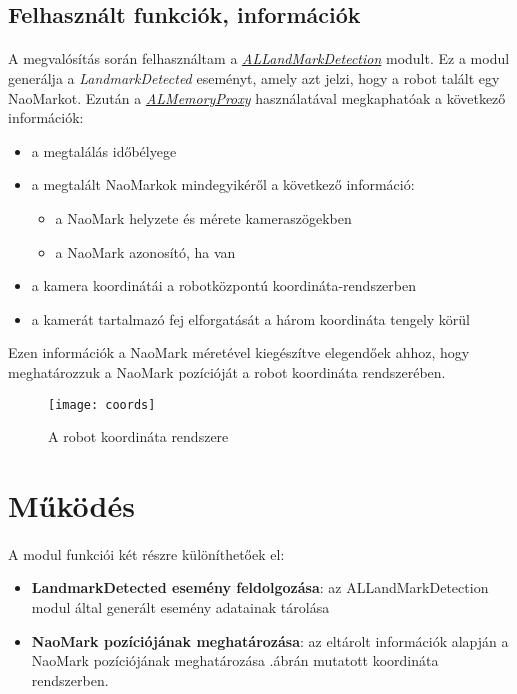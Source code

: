 \documentclass{article}
\numberwithin{figure}{section}
\newcommand{\figref}[1]{\aref{fig:#1}.ábr}
\newenvironment{compactlist}
{ \begin{itemize}
    \setlength{\itemsep}{0pt}
    \setlength{\parskip}{0pt}
    \setlength{\parsep}{0pt}
	\setlength{\topsep}{0pt}
}
{ \end{itemize}}
\begin{document}
\begin{sloppypar}
		\subsection{Felhasznált funkciók, információk}
		\paragraph{}
		A megvalósítás során felhasználtam a \href{http://doc.aldebaran.com/1-14/naoqi/vision/allandmarkdetection.html}{\textit{ALLandMarkDetection}} modult. Ez a modul generálja a \textit{LandmarkDetected} eseményt, amely azt jelzi, hogy a robot talált egy NaoMarkot. Ezután a \href{http://doc.aldebaran.com/1-14/naoqi/core/almemory-api.html?highlight=almemory#ALMemoryProxy}{\textit{ALMemoryProxy}} használatával megkaphatóak a következő információk:
		\begin{compactlist}
			\item a megtalálás időbélyege
			\item a megtalált NaoMarkok mindegyikéről a következő információ:
			\begin{compactlist}
				\item a NaoMark helyzete és mérete kameraszögekben
				\item a NaoMark azonosító, ha van
			\end{compactlist}
			\item a kamera koordinátái a robotközpontú koordináta-rendszerben
			\item a kamerát tartalmazó fej elforgatását a három koordináta tengely körül
		\end{compactlist}\par
		Ezen információk a NaoMark méretével kiegészítve elegendőek ahhoz, hogy meghatározzuk a NaoMark pozícióját a robot koordináta rendszerében.\\
		\begin{wrapfigure}[14]{R}{0\textwidth}
    		\centering
		    \texttt{[image: coords]}
		    \caption{A robot koordináta rendszere}
		    \label{fig:coords}
		\end{wrapfigure}
		\section{Működés}
		\paragraph{}		
		A modul funkciói két részre különíthetőek el: 
		\begin{compactlist}
			\item \textbf{LandmarkDetected esemény feldolgozása}: az ALLandMarkDetection modul által generált esemény adatainak tárolása
			\item \textbf{NaoMark pozíciójának meghatározása}: az eltárolt információk alapján a NaoMark pozíciójának meghatározása \figref{coords}án mutatott koordináta rendszerben.
		\end{compactlist}
		

\end{sloppypar}
\end{document}
